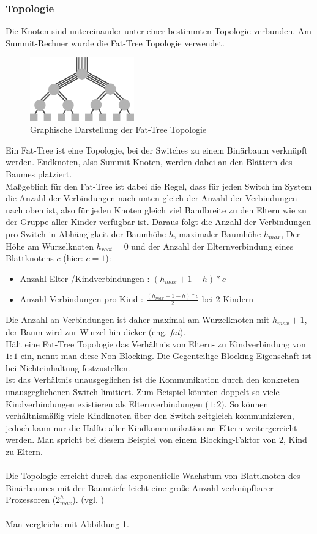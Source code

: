 \subsubsection{Topologie}
Die Knoten sind untereinander unter einer bestimmten Topologie verbunden. Am Summit-Rechner wurde die Fat-Tree Topologie verwendet.\\
\begin{figure}
\centering
\includegraphics[width=0.4\textwidth]{res/fat_tree.png}
\caption{\cite{fattree} Graphische Darstellung der Fat-Tree Topologie}
	\label{fig:fat_tree}
\end{figure}
Ein Fat-Tree ist eine Topologie, bei der Switches zu einem Binärbaum verknüpft werden. Endknoten, also Summit-Knoten, werden dabei an den Blättern des Baumes platziert.\\
Maßgeblich für den Fat-Tree ist dabei die Regel, dass für jeden Switch im System die Anzahl der Verbindungen nach unten gleich der Anzahl der Verbindungen nach oben ist, also für jeden Knoten gleich viel Bandbreite zu den Eltern wie zu der Gruppe aller Kinder verfügbar ist. Daraus folgt die Anzahl der Verbindungen pro Switch in Abhängigkeit der Baumhöhe $h$, maximaler Baumhöhe $h_{max}$, Der Höhe am Wurzelknoten $h_{root}=0$ und der Anzahl der Elternverbindung eines Blattknotens $c$ (hier: $c=1$):
\begin{itemize}
	\item Anzahl Elter-/Kindverbindungen : $(h_{max}+1-h)*c$
	\item Anzahl Verbindungen pro Kind : $\frac{(h_{max}+1-h)*c}{2}$ bei 2 Kindern
\end{itemize}
Die Anzahl an Verbindungen ist daher maximal am Wurzelknoten mit $h_{max}+1$, der Baum wird zur Wurzel hin \glqq dicker (eng. \textit{fat})\grqq.\\
Hält eine Fat-Tree Topologie das Verhältnis von Eltern- zu Kindverbindung von $1:1$ ein, nennt man diese Non-Blocking. Die Gegenteilige Blocking-Eigenschaft ist bei Nichteinhaltung festzustellen.\\
Ist das Verhältnis unausgeglichen ist die Kommunikation durch den konkreten unausgeglichenen Switch limitiert. Zum Beispiel könnten doppelt so viele Kindverbindungen existieren als Elternverbindungen ($1:2)$. So können verhältnismäßig viele Kindknoten über den Switch zeitgleich kommunizieren, jedoch kann nur die Hälfte aller Kindkommunikation an Eltern weitergereicht werden. Man spricht bei diesem Beispiel von einem Blocking-Faktor von 2, Kind zu Eltern.\\
\\
Die Topologie erreicht durch das exponentielle Wachstum von Blattknoten des Binärbaumes mit der Baumtiefe leicht eine große Anzahl verknüpfbarer Prozessoren ($2^h_{max}$). (vgl. \cite{fattree})\\
\\
Man vergleiche mit Abbildung \ref{fig:fat_tree}.

